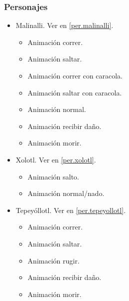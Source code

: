 \documentclass[11pt,letterpaper]{article}
\begin{document}
	\subsubsection{Personajes}
\begin{itemize}
	\item Malinalli. Ver en \ref{per.malinalli}.
		\begin{itemize}
			\item Animación correr.
			\item Animación saltar.
			\item Animación correr con caracola.
			\item Animación saltar con caracola.
			\item Animación normal.
			\item Animación recibir daño.
			\item Animación morir.
		\end{itemize}
	\item Xolotl. Ver en \ref{per.xolotl}.
		\begin{itemize}
				\item Animación salto.
				\item Animación normal/nado.
		\end{itemize}
	\item Tepeyóllotl. Ver en \ref{per.tepeyollotl}.
		\begin{itemize}
			\item Animación correr.
			\item Animación saltar.
			\item Animación rugir.
			\item Animación recibir daño.
			\item Animación morir.
		\end{itemize}
\end{itemize}
\end{document}
